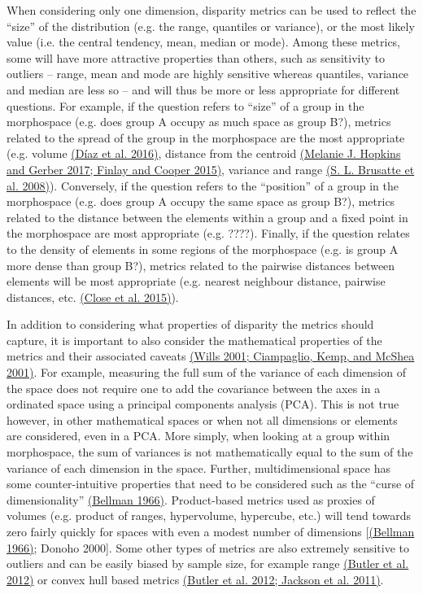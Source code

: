 When considering only one dimension, disparity metrics can be used to
reflect the ``size'' of the distribution (e.g. the range, quantiles or
variance), or the most likely value (i.e. the central tendency, mean,
median or mode). Among these metrics, some will have more attractive
properties than others, such as sensitivity to outliers -- range, mean
and mode are highly sensitive whereas quantiles, variance and median are
less so -- and will thus be more or less appropriate for different
questions. For example, if the question refers to ``size'' of a group in
the morphospace (e.g. does group A occupy as much space as group B?),
metrics related to the spread of the group in the morphospace are the
most appropriate (e.g. volume
\href{https://paperpile.com/c/sTGYvp/47fI}{(Díaz et al. 2016)}, distance
from the centroid
\href{https://paperpile.com/c/sTGYvp/vTHS+yyNa}{(Melanie J. Hopkins and
Gerber 2017; Finlay and Cooper 2015)}, variance and range
\href{https://paperpile.com/c/sTGYvp/tGyd}{(S. L. Brusatte et al.
2008)}). Conversely, if the question refers to the ``position'' of a
group in the morphospace (e.g. does group A occupy the same space as
group B?), metrics related to the distance between the elements within a
group and a fixed point in the morphospace are most appropriate (e.g.
????). Finally, if the question relates to the density of elements in
some regions of the morphospace (e.g. is group A more dense than group
B?), metrics related to the pairwise distances between elements will be
most appropriate (e.g. nearest neighbour distance, pairwise distances,
etc. \href{https://paperpile.com/c/sTGYvp/PbSx}{(Close et al. 2015)}).

In addition to considering what properties of disparity the metrics
should capture, it is important to also consider the mathematical
properties of the metrics and their associated caveats
\href{https://paperpile.com/c/sTGYvp/nFf7+ROH8}{(Wills 2001; Ciampaglio,
Kemp, and McShea 2001)}. For example, measuring the full sum of the
variance of each dimension of the space does not require one to add the
covariance between the axes in a ordinated space using a principal
components analysis (PCA). This is not true however, in other
mathematical spaces or when not all dimensions or elements are
considered, even in a PCA. More simply, when looking at a group within
morphospace, the sum of variances is not mathematically equal to the sum
of the variance of each dimension in the space. Further,
multidimensional space has some counter-intuitive properties that need
to be considered such as the ``curse of dimensionality''
\href{https://paperpile.com/c/sTGYvp/Qsl3}{(Bellman 1966)}.
Product-based metrics used as proxies of volumes (e.g. product of
ranges, hypervolume, hypercube, etc.) will tend towards zero fairly
quickly for spaces with even a modest number of dimensions
{[}\href{https://paperpile.com/c/sTGYvp/Qsl3}{(Bellman 1966)}; Donoho
2000{]}. Some other types of metrics are also extremely sensitive to
outliers and can be easily biased by sample size, for example range
\href{https://paperpile.com/c/sTGYvp/aSSL}{(Butler et al. 2012)} or
convex hull based metrics
\href{https://paperpile.com/c/sTGYvp/aSSL+PwyQ}{(Butler et al. 2012;
Jackson et al. 2011)}.

